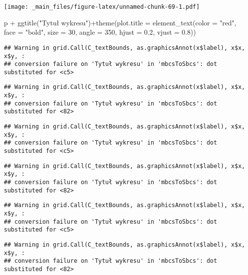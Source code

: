 \documentclass[
]{book}
\newenvironment{Shaded}{\begin{snugshade}}{\end{snugshade}}
\newcommand{\AttributeTok}[1]{\textcolor[rgb]{0.77,0.63,0.00}{#1}}
\newcommand{\DecValTok}[1]{\textcolor[rgb]{0.00,0.00,0.81}{#1}}
\newcommand{\FloatTok}[1]{\textcolor[rgb]{0.00,0.00,0.81}{#1}}
\newcommand{\FunctionTok}[1]{\textcolor[rgb]{0.00,0.00,0.00}{#1}}
\newcommand{\NormalTok}[1]{#1}
\newcommand{\SpecialCharTok}[1]{\textcolor[rgb]{0.00,0.00,0.00}{#1}}
\newcommand{\StringTok}[1]{\textcolor[rgb]{0.31,0.60,0.02}{#1}}
\begin{document}
\texttt{[image: \_main\_files/figure-latex/unnamed-chunk-69-1.pdf]}

\begin{Shaded}
\begin{Highlighting}[]
\NormalTok{p }\SpecialCharTok{+} \FunctionTok{ggtitle}\NormalTok{(}\StringTok{"Tytuł wykresu"}\NormalTok{)}\SpecialCharTok{+}\FunctionTok{theme}\NormalTok{(}\AttributeTok{plot.title =} \FunctionTok{element\_text}\NormalTok{(}\AttributeTok{color =} \StringTok{"red"}\NormalTok{, }
                                                           \AttributeTok{face =} \StringTok{"bold"}\NormalTok{, }\AttributeTok{size =} \DecValTok{30}\NormalTok{, }\AttributeTok{angle =} \DecValTok{350}\NormalTok{, }\AttributeTok{hjust =} \FloatTok{0.2}\NormalTok{, }\AttributeTok{vjust =} \FloatTok{0.8}\NormalTok{))}
\end{Highlighting}
\end{Shaded}

\begin{verbatim}
## Warning in grid.Call(C_textBounds, as.graphicsAnnot(x$label), x$x, x$y, :
## conversion failure on 'Tytuł wykresu' in 'mbcsToSbcs': dot substituted for <c5>
\end{verbatim}

\begin{verbatim}
## Warning in grid.Call(C_textBounds, as.graphicsAnnot(x$label), x$x, x$y, :
## conversion failure on 'Tytuł wykresu' in 'mbcsToSbcs': dot substituted for <82>
\end{verbatim}

\begin{verbatim}
## Warning in grid.Call(C_textBounds, as.graphicsAnnot(x$label), x$x, x$y, :
## conversion failure on 'Tytuł wykresu' in 'mbcsToSbcs': dot substituted for <c5>
\end{verbatim}

\begin{verbatim}
## Warning in grid.Call(C_textBounds, as.graphicsAnnot(x$label), x$x, x$y, :
## conversion failure on 'Tytuł wykresu' in 'mbcsToSbcs': dot substituted for <82>
\end{verbatim}

\begin{verbatim}
## Warning in grid.Call(C_textBounds, as.graphicsAnnot(x$label), x$x, x$y, :
## conversion failure on 'Tytuł wykresu' in 'mbcsToSbcs': dot substituted for <c5>
\end{verbatim}

\begin{verbatim}
## Warning in grid.Call(C_textBounds, as.graphicsAnnot(x$label), x$x, x$y, :
## conversion failure on 'Tytuł wykresu' in 'mbcsToSbcs': dot substituted for <82>
\end{verbatim}
\end{document}
